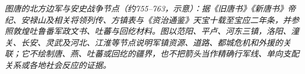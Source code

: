 \begin{center}

\smallskip
\small\textit{图\quad 唐的北方边军与安史战争节点（约755--763，示意）：据《旧唐书》《新唐书》帝纪、安禄山及相关将领列传、方镇表与《资治通鉴》天宝十载至宝应二年条，并参照敦煌吐鲁番军政文书、吐蕃与回纥材料。图以范阳、平卢、河东三镇，洛阳、潼关、长安、灵武及河北、江淮等节点说明军镇资源、道路、都城危机和外援的关联；它不绘制唐、燕、吐蕃或回纥的疆界，也不把箭头当作精确行军线、单向支配关系或各地社会反应的证据。}
\end{center}
